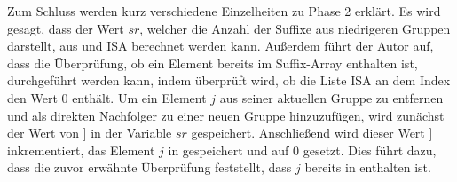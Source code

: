 Zum Schluss werden kurz verschiedene Einzelheiten zu Phase 2 erklärt. 
Es wird gesagt, dass der Wert $sr$, welcher die Anzahl der Suffixe aus niedrigeren Gruppen darstellt, aus \sa und ISA berechnet werden kann. 
Außerdem führt der Autor auf, dass die Überprüfung, ob ein Element bereits im Suffix-Array enthalten ist, durchgeführt werden kann, indem überprüft wird, ob die Liste ISA an dem Index den Wert 0 enthält. 
Um ein Element $j$ aus seiner aktuellen Gruppe zu entfernen und als direkten Nachfolger zu einer neuen Gruppe hinzuzufügen, wird zunächst der Wert von \sa[ISA[$j$]] in der Variable $sr$ gespeichert. 
Anschließend wird dieser Wert \sa[\isa[$j$]] inkrementiert, das Element $j$ in \sa[$sr$] gespeichert und \isa[$j$] auf 0 gesetzt. 
Dies führt dazu, dass die zuvor erwähnte Überprüfung feststellt, dass $j$ bereits in \sa enthalten ist.
